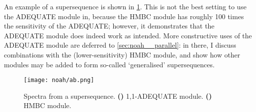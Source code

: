 An example of a  supersequence is shown in \cref{fig:noah_ab}.
This is not the best setting to use the ADEQUATE module in, because the \carbon{} HMBC module has roughly 100 times the sensitivity of the ADEQUATE; however, it demonstrates that the ADEQUATE module does indeed work as intended.
More constructive uses of the ADEQUATE module are deferred to \cref{sec:noah__parallel}: in there, I discuss combinations with the (lower-sensitivity) \nitrogen{} HMBC module, and show how other modules may be added to form so-called `generalised' supersequences.

\begin{figure}[htb]
    \centering
    \texttt{[image: noah/ab.png]}%
    {\label{fig:noah_ab_a}}%
    \caption[Spectra from  supersequence]{
        Spectra from a  supersequence.
        \textbf{()} 1,1-ADEQUATE module.
        \textbf{()} HMBC module.
    }
    \label{fig:noah_ab}
\end{figure}
